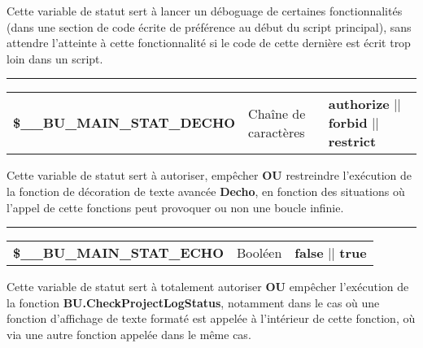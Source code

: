 \documentclass[a4paper,10pt]{article}
\begin{document}
\begin{justify}
    Cette variable de statut sert à lancer un déboguage de certaines fonctionnalités (dans une section de code écrite de préférence au début du script principal), sans attendre l'atteinte à cette fonctionnalité si le code de cette dernière est écrit trop loin dans un script.
\end{justify}


\par\noindent\rule{\textwidth}{0.4pt}

\begin{justify}
    \begin{tabular}{l|l|l}
        \textbf{\color{vars}\$\_\_BU\_MAIN\_STAT\_DECHO}  & Chaîne de caractères    & \textbf{authorize} || \textbf{forbid} || \textbf{restrict}\\[1\baselineskip]
    \end{tabular}
\end{justify}

\begin{justify}
    Cette variable de statut sert à autoriser, empêcher \textbf{OU} restreindre l'exécution de la fonction de décoration de texte avancée \textbf{\color{func}Decho}, en fonction des situations où l'appel de cette fonctions peut provoquer ou non une boucle infinie.
\end{justify}


\par\noindent\rule{\textwidth}{0.4pt}

\begin{justify}
    \begin{tabular}{l|l|l}
        \textbf{\color{vars}\$\_\_BU\_MAIN\_STAT\_ECHO}   & Booléen      & \textbf{false} || \textbf{true}\\[1\baselineskip]
    \end{tabular}
\end{justify}

\begin{justify}
    Cette variable de statut sert à totalement autoriser \textbf{OU} empêcher l'exécution de la fonction \textbf{\color{func}BU.CheckProjectLogStatus}, notamment dans le cas où une fonction d'affichage de texte formaté est appelée à l'intérieur de cette fonction, où via une autre fonction appelée dans le même cas.
\end{justify}

\end{document}
